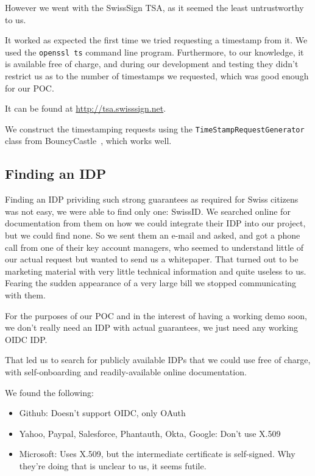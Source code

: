 However we went with the SwissSign \gls{TSA}, as it seemed the least untrustworthy to us.

It worked as expected the first time we tried requesting a timestamp from it.
We used the \texttt{openssl ts} command line program.
Furthermore, to our knowledge, it is available free of charge,
and during our development and testing they didn't restrict us as to the number of timestamps we requested,
which was good enough for our \gls{POC}.

It can be found at \url{http://tsa.swisssign.net}.

We construct the timestamping requests using the \texttt{TimeStampRequestGenerator} class from BouncyCastle~\cite{timestamprequestgenerator},
which works well.

\subsection{Finding an IDP}\label{sec:finding-an-idp}
Finding an \gls{IDP} prividing such strong guarantees as required for Swiss citizens was not easy,
we were able to find only one: SwissID.
We searched online for documentation from them on how we could integrate their \gls{IDP} into our project,
but we could find none.
So we sent them an e-mail and asked, and got a phone call from one of their key account managers,
who seemed to understand little of our actual request but wanted to send us a whitepaper.
That turned out to be marketing material with very little technical information and quite useless to us.
Fearing the sudden appearance of a very large bill we stopped communicating with them.

For the purposes of our \gls{POC} and in the interest of having a working demo soon,
we don't really need an \gls{IDP} with actual guarantees, we just need any working \gls{OIDC} \gls{IDP}.

That led us to search for publicly available \gls{IDP}s that we could use free of charge,
with self-onboarding and readily-available online documentation.

We found the following:
\begin{itemize}
    \item Github: Doesn't support \gls{OIDC}, only OAuth
    \item Yahoo, Paypal, Salesforce, Phantauth, Okta, Google: Don't use X.509
    \item Microsoft: Uses X.509, but the intermediate certificate is self-signed. Why they're doing that is unclear to us, it seems futile.
\end{itemize}

